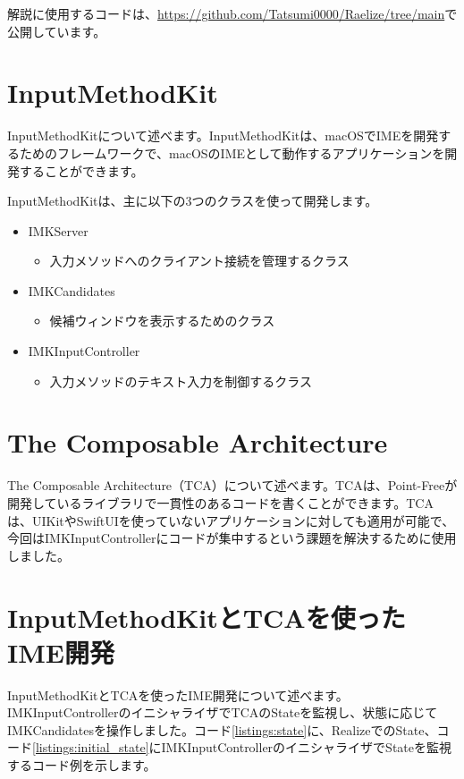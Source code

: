 \documentclass[uplatex,a4j,12pt,twocolumn]{jsarticle}
\begin{document}
解説に使用するコードは、\url{https://github.com/Tatsumi0000/Raelize/tree/main}で公開しています。

\section{InputMethodKit}\label{sec:abount_inputmethodkit}
InputMethodKitについて述べます。InputMethodKitは、macOSでIMEを開発するためのフレームワークで、macOSのIMEとして動作するアプリケーションを開発することができます。

InputMethodKitは、主に以下の3つのクラスを使って開発します。
\begin{itemize}
    \item IMKServer
    \begin{itemize}
        \item 入力メソッドへのクライアント接続を管理するクラス\cite{bib:imkserver}
    \end{itemize}
    \item IMKCandidates
    \begin{itemize}
        \item 候補ウィンドウを表示するためのクラス\cite{bib:imk_candidates}
    \end{itemize}
    \item IMKInputController
    \begin{itemize}
        \item 入力メソッドのテキスト入力を制御するクラス\cite{bib:imk_input_controller}
    \end{itemize}
\end{itemize}


\section{The Composable Architecture}\label{sec:the_composable_architecture}
The Composable Architecture（TCA）について述べます。TCAは、Point-Freeが開発しているライブラリで一貫性のあるコードを書くことができます。TCAは、UIKitやSwiftUIを使っていないアプリケーションに対しても適用が可能で、今回はIMKInputControllerにコードが集中するという課題を解決するために使用しました。

\section{InputMethodKitとTCAを使ったIME開発}\label{sec:use_imk_and_tca}
InputMethodKitとTCAを使ったIME開発について述べます。IMKInputControllerのイニシャライザでTCAのStateを監視し、状態に応じてIMKCandidatesを操作しました。コード\ref{listings:state}に、RealizeでのState、コード\ref{listings:initial_state}にIMKInputControllerのイニシャライザでStateを監視するコード例を示します。
\end{document}
